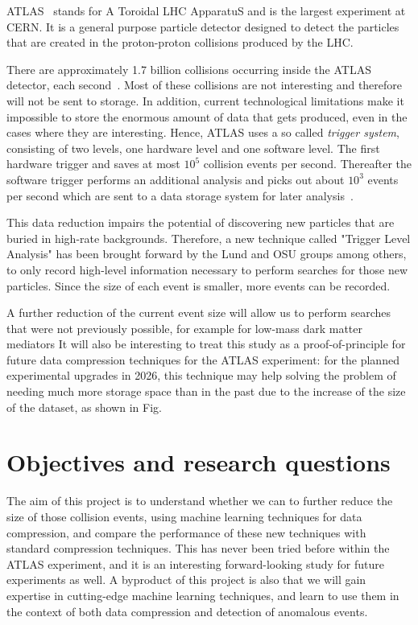 \documentclass[11pt]{article}
\begin{document}
ATLAS~\cite{Collaboration_2008} stands for A Toroidal LHC ApparatuS and is the largest experiment at CERN. It is a general purpose particle detector designed to detect the particles that are created in the proton-proton collisions produced by the LHC.

There are approximately 1.7 billion collisions occurring inside the ATLAS detector, each second~\cite{trigger_das}. Most of these collisions are not interesting and therefore will not be sent to storage. In addition, current technological limitations make it impossible to store the enormous amount of data that gets produced, even in the cases where they are interesting. Hence, ATLAS uses a so called \emph{trigger system}, consisting of two levels, one hardware level and one software level. The first hardware trigger and saves at most $10^5$ collision events per second. Thereafter the software trigger performs an additional analysis and picks out about $10^3$ events per second which are sent to a data storage system for later analysis~\cite{trigger_das}.

This data reduction impairs the potential of discovering new particles that are buried in high-rate backgrounds. Therefore, a new technique called "Trigger Level Analysis" has been brought forward by the Lund and OSU groups among others, to only record high-level information necessary to perform searches for those new particles. Since the size of each event is smaller, more events can be recorded. 

A further reduction of the current event size will allow us to perform searches that were not previously possible, for example for low-mass dark matter mediators
It will also be interesting to treat this study as a proof-of-principle for future data compression techniques for the ATLAS experiment: for the planned experimental upgrades in 2026, this technique may help solving the problem of needing much more storage space than in the past due to the increase of the size of the dataset, as shown in Fig.

\section{Objectives and research questions}

The aim of this project is to understand whether we can to further reduce the size of those collision events, using machine learning techniques for data compression, and compare the performance of these new techniques with standard compression techniques. This has never been tried before within the ATLAS experiment, and it is an interesting forward-looking study for future experiments as well. 
A byproduct of this project is also that we %
will gain expertise in cutting-edge machine learning techniques, and learn to use them in the context of both data compression and detection of anomalous events. 
\end{document}
